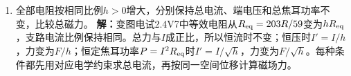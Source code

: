 \documentclass[UTF8,fontset=fandol,a4paper,11pt]{ctexart}
\begin{document}
\begin{enumerate}
\item 全部电阻按相同比例$h>0$增大，分别保持总电流、端电压和总焦耳功率不变，比较总磁力。
\textbf{解：}变图电试2.4V7中等效电阻从$R_{\rm eq}=203R/59$变为$hR_{\rm eq}$，支路电流比例保持相同。总力与$I$成正比，所以恒流时不变；恒压时$I'=I/h$，力变为$F/h$；恒定焦耳功率$P=I^2R_{\rm eq}$时$I'=I/\sqrt h$，力变为$F/\sqrt h$。每种条件都先用对应电学约束求总电流，再按同一空间位移计算磁场力。
\begin{center}\begin{minipage}{.98\linewidth}\centering
{}
\end{minipage}
\end{center}
\end{enumerate}
\end{document}
